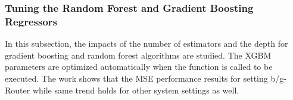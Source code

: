
\subsubsection{Tuning the Random Forest and Gradient Boosting Regressors}

In this subsection, the impacts of the number of estimators and the depth for gradient boosting and random forest algorithms are studied. The XGBM parameters are optimized automatically when the function is called to be executed. The work shows that the MSE performance results for setting b/g-Router while same trend holds for other system settings as well. 

